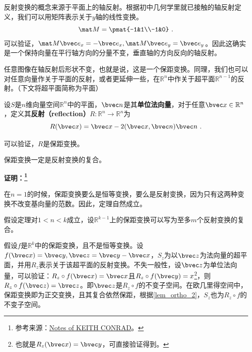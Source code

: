 
\begin{issues}
\issueMissDepend
\end{issues}

反射变换的概念来源于平面上的轴反射。根据初中几何学里就已接触的轴反射定义，我们可以用矩阵表示关于$y$轴的线性变换。
\begin{equation}
\mat M=\pmat{-1&1\\-1&0}~.
\end{equation}
可以验证，$\mat M\bvec e_x=-\bvec e_x,\mat M \bvec e_y=\bvec e_y$。因此这确实是一个保持向量在平行轴方向的分量不变，垂直轴的方向反向的轴反射。

任意图像在轴反射后形状不变，也就是说，这是一个保距变换。同理，我们也可以对任意向量作关于平面的反射，或者更延伸一些，在$\mathbb R^n$中作关于超平面$\mathbb R^{n-1}$的反射。（下文将超平面简称为平面）
\begin{definition}{}
设$S$是$n$维向量空间$\mathbb R^n$中的平面，$\bvec n$是其\textbf{单位法向量}，对于任意$\bvec x\in \mathbb R^n$，定义其\textbf{反射（reflection）}$R:\mathbb R^n\rightarrow \mathbb R^n$为
\begin{equation}
R(\bvec x)=\bvec x-2(\bvec x,\bvec n)\bvec n~.
\end{equation}
\end{definition}
可以验证，$R$是保距变换。


\begin{theorem}{}
保距变换一定是反射变换的复合。
\end{theorem}
\textbf{证明：\footnote{参考来源：\href{https://kconrad.math.uconn.edu/blurbs/grouptheory/isometryRn.pdf}{Notes of KEITH CONRAD}。}}

在$n=1$的时候，保距变换要么是恒等变换，要么是反射变换，因为只有这两种变换不改变基向量的范数。因此，定理自然成立。

假设定理对$1<n<k$成立，设$\mathbb R^{k-1}$上的保距变换可以写为至多$m$个反射变换的复合。 

假设$f$是$\mathbb R^k$中的保距变换，且不是恒等变换。设$f(\bvec x)=\bvec y,\bvec z=\bvec y-\bvec x$，$S_z$为以$\bvec z$为法向量的超平面，并用$R_z$表示关于该超平面的反射变换。不失一般性，设$\bvec z$为单位法向量，可以验证：$R_z\circ f(\bvec x)=\bvec x$且$R_z\circ f(\bvec y)=x$\footnote{也就是$R_z(\bvec x)=\bvec y$，可直接验证得到。}，则$R_z\circ f(\bvec z)=\bvec z$。即$\bvec z$是$R_z\circ f$的不变子空间。在欧几里得空间中，保距变换即为正交变换，且其复合依然保距，根据\autoref{lem_ortho_2}，$S_z$也为$R_z\circ f$的不变子空间。

